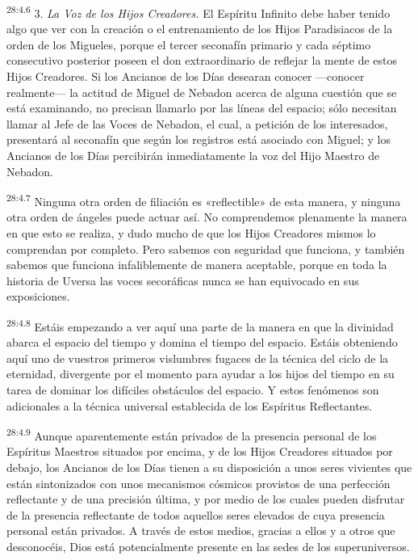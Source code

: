 \par
\textsuperscript{28:4.6} 3. \textit{La Voz de los Hijos Creadores.} El Espíritu Infinito debe haber tenido algo que ver con la creación o el entrenamiento de los Hijos Paradisiacos de la orden de los Migueles, porque el tercer seconafín primario y cada séptimo consecutivo posterior poseen el don extraordinario de reflejar la mente de estos Hijos Creadores. Si los Ancianos de los Días desearan conocer ---conocer realmente--- la actitud de Miguel de Nebadon acerca de alguna cuestión que se está examinando, no precisan llamarlo por las líneas del espacio; sólo necesitan llamar al Jefe de las Voces de Nebadon, el cual, a petición de los interesados, presentará al seconafín que según los registros está asociado con Miguel; y los Ancianos de los Días percibirán inmediatamente la voz del Hijo Maestro de Nebadon.

\par
\textsuperscript{28:4.7} Ninguna otra orden de filiación es «reflectible» de esta manera, y ninguna otra orden de ángeles puede actuar así. No comprendemos plenamente la manera en que esto se realiza, y dudo mucho de que los Hijos Creadores mismos lo comprendan por completo. Pero sabemos con seguridad que funciona, y también sabemos que funciona infaliblemente de manera aceptable, porque en toda la historia de Uversa las voces secoráficas nunca se han equivocado en sus exposiciones.

\par
\textsuperscript{28:4.8} Estáis empezando a ver aquí una parte de la manera en que la divinidad abarca el espacio del tiempo y domina el tiempo del espacio. Estáis obteniendo aquí uno de vuestros primeros vislumbres fugaces de la técnica del ciclo de la eternidad, divergente por el momento para ayudar a los hijos del tiempo en su tarea de dominar los difíciles obstáculos del espacio. Y estos fenómenos son adicionales a la técnica universal establecida de los Espíritus Reflectantes.

\par
\textsuperscript{28:4.9} Aunque aparentemente están privados de la presencia personal de los Espíritus Maestros situados por encima, y de los Hijos Creadores situados por debajo, los Ancianos de los Días tienen a su disposición a unos seres vivientes que están sintonizados con unos mecanismos cósmicos provistos de una perfección reflectante y de una precisión última, y por medio de los cuales pueden disfrutar de la presencia reflectante de todos aquellos seres elevados de cuya presencia personal están privados. A través de estos medios, gracias a ellos y a otros que desconocéis, Dios está potencialmente presente en las sedes de los superuniversos.

